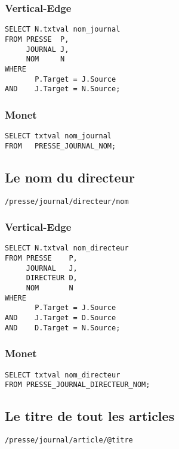 \subsubsection{Vertical-Edge}
\begin{verbatim}
SELECT N.txtval nom_journal
FROM PRESSE  P,
     JOURNAL J,
     NOM     N
WHERE
       P.Target = J.Source
AND    J.Target = N.Source;
\end{verbatim}

\subsubsection{Monet}
\begin{verbatim}
SELECT txtval nom_journal
FROM   PRESSE_JOURNAL_NOM;
\end{verbatim}

\subsection {Le nom du directeur}
\begin{verbatim}
/presse/journal/directeur/nom
\end{verbatim}
\subsubsection{Vertical-Edge}
\begin{verbatim}
SELECT N.txtval nom_directeur
FROM PRESSE    P,
     JOURNAL   J,
     DIRECTEUR D,
     NOM       N
WHERE
       P.Target = J.Source
AND    J.Target = D.Source
AND    D.Target = N.Source;
\end{verbatim}

\subsubsection{Monet}
\begin{verbatim}
SELECT txtval nom_directeur
FROM PRESSE_JOURNAL_DIRECTEUR_NOM;
\end{verbatim}

\subsection {Le titre de tout les articles}
\begin{verbatim}
/presse/journal/article/@titre
\end{verbatim}

